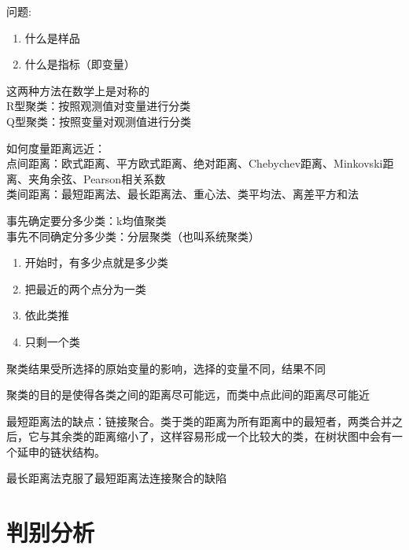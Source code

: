 \documentclass[UTF8,10pt]{book}
\begin{document}
问题:

\begin{enumerate}
	\def\labelenumi{\arabic{enumi}.}
	\item
	什么是样品
	\item
	什么是指标（即变量）
\end{enumerate}

这两种方法在数学上是对称的\\
R型聚类：按照观测值对变量进行分类\\
Q型聚类：按照变量对观测值进行分类

如何度量距离远近：\\
点间距离：欧式距离、平方欧式距离、绝对距离、Chebychev距离、Minkovski距离、夹角余弦、Pearson相关系数\\
类间距离：最短距离法、最长距离法、重心法、类平均法、离差平方和法

事先确定要分多少类：k均值聚类\\
事先不同确定分多少类：分层聚类（也叫系统聚类）

\begin{enumerate}
	\def\labelenumi{\arabic{enumi}.}
	\item
	开始时，有多少点就是多少类
	\item
	把最近的两个点分为一类
	\item
	依此类推
	\item
	只剩一个类
\end{enumerate}

聚类结果受所选择的原始变量的影响，选择的变量不同，结果不同

聚类的目的是使得各类之间的距离尽可能远，而类中点此间的距离尽可能近

最短距离法的缺点：链接聚合。类于类的距离为所有距离中的最短者，两类合并之后，它与其余类的距离缩小了，这样容易形成一个比较大的类，在树状图中会有一个延申的链状结构。

最长距离法克服了最短距离法连接聚合的缺陷

\section{判别分析 }\label{header-n49}
\end{document}
